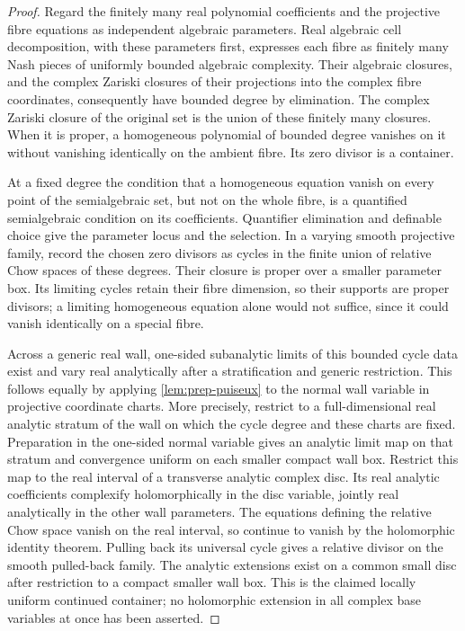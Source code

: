 \begin{proof}
Regard the finitely many real polynomial coefficients and the projective fibre equations as independent algebraic parameters. Real algebraic cell decomposition, with these parameters first, expresses each fibre as finitely many Nash pieces of uniformly bounded algebraic complexity. Their algebraic closures, and the complex Zariski closures of their projections into the complex fibre coordinates, consequently have bounded degree by elimination. The complex Zariski closure of the original set is the union of these finitely many closures. When it is proper, a homogeneous polynomial of bounded degree vanishes on it without vanishing identically on the ambient fibre. Its zero divisor is a container.

At a fixed degree the condition that a homogeneous equation vanish on every point of the semialgebraic set, but not on the whole fibre, is a quantified semialgebraic condition on its coefficients. Quantifier elimination and definable choice give the parameter locus and the selection. In a varying smooth projective family, record the chosen zero divisors as cycles in the finite union of relative Chow spaces of these degrees. Their closure is proper over a smaller parameter box. Its limiting cycles retain their fibre dimension, so their supports are proper divisors; a limiting homogeneous equation alone would not suffice, since it could vanish identically on a special fibre.

Across a generic real wall, one-sided subanalytic limits of this bounded cycle data exist and vary real analytically after a stratification and generic restriction. This follows equally by applying \cref{lem:prep-puiseux} to the normal wall variable in projective coordinate charts. More precisely, restrict to a full-dimensional real analytic stratum of the wall on which the cycle degree and these charts are fixed. Preparation in the one-sided normal variable gives an analytic limit map on that stratum and convergence uniform on each smaller compact wall box. Restrict this map to the real interval of a transverse analytic complex disc. Its real analytic coefficients complexify holomorphically in the disc variable, jointly real analytically in the other wall parameters. The equations defining the relative Chow space vanish on the real interval, so continue to vanish by the holomorphic identity theorem. Pulling back its universal cycle gives a relative divisor on the smooth pulled-back family. The analytic extensions exist on a common small disc after restriction to a compact smaller wall box. This is the claimed locally uniform continued container; no holomorphic extension in all complex base variables at once has been asserted.
\end{proof}

